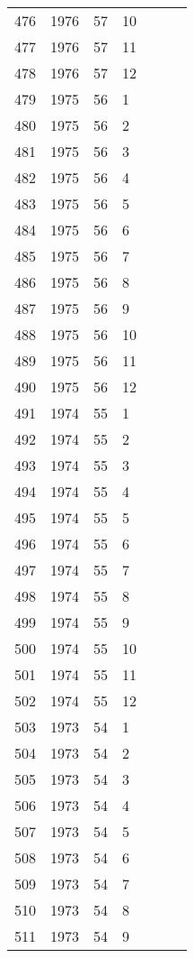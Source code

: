 \begin{longtable}{ |l|l|l|l|l|l|l| }
476 & 1976 & 57 & 10 &  &  &  \\
477 & 1976 & 57 & 11 &  &  &  \\
478 & 1976 & 57 & 12 &  &  &  \\
479 & 1975 & 56 & 1 &  &  &  \\
480 & 1975 & 56 & 2 &  &  &  \\
481 & 1975 & 56 & 3 &  &  &  \\
482 & 1975 & 56 & 4 &  &  &  \\
483 & 1975 & 56 & 5 &  &  &  \\
484 & 1975 & 56 & 6 &  &  &  \\
485 & 1975 & 56 & 7 &  &  &  \\
486 & 1975 & 56 & 8 &  &  &  \\
487 & 1975 & 56 & 9 &  &  &  \\
488 & 1975 & 56 & 10 &  &  &  \\
489 & 1975 & 56 & 11 &  &  &  \\
490 & 1975 & 56 & 12 &  &  &  \\
491 & 1974 & 55 & 1 &  &  &  \\
492 & 1974 & 55 & 2 &  &  &  \\
493 & 1974 & 55 & 3 &  &  &  \\
494 & 1974 & 55 & 4 &  &  &  \\
495 & 1974 & 55 & 5 &  &  &  \\
496 & 1974 & 55 & 6 &  &  &  \\
497 & 1974 & 55 & 7 &  &  &  \\
498 & 1974 & 55 & 8 &  &  &  \\
499 & 1974 & 55 & 9 &  &  &  \\
500 & 1974 & 55 & 10 &  &  &  \\
501 & 1974 & 55 & 11 &  &  &  \\
502 & 1974 & 55 & 12 &  &  &  \\
503 & 1973 & 54 & 1 &  &  &  \\
504 & 1973 & 54 & 2 &  &  &  \\
505 & 1973 & 54 & 3 &  &  &  \\
506 & 1973 & 54 & 4 &  &  &  \\
507 & 1973 & 54 & 5 &  &  &  \\
508 & 1973 & 54 & 6 &  &  &  \\
509 & 1973 & 54 & 7 &  &  &  \\
510 & 1973 & 54 & 8 &  &  &  \\
511 & 1973 & 54 & 9 &  &  &  \\

\end{longtable}
